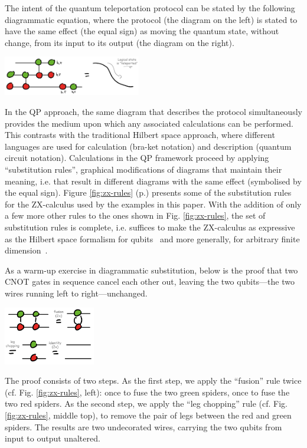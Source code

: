 The intent of the quantum teleportation protocol can be stated by the following diagrammatic equation, where the protocol (the diagram on the left) is stated to have the same effect (the equal sign) as moving the quantum state, without change, from its input to its output (the diagram on the right).
\begin{center}
    \includegraphics[width=0.45\textwidth]{Sections/pictures/teleportation-diag-reasoning.png}
\end{center}
In the QP approach, the same diagram that describes the protocol simultaneously provides the medium upon which any associated calculations can be performed.
This contrasts with the traditional Hilbert space approach, where different languages are used for calculation (bra-ket notation) and description (quantum circuit notation).
Calculations in the QP framework proceed by applying ``substitution rules'', graphical modifications of diagrams that maintain their meaning, i.e. that result in different diagrams with the same effect (symbolised by the equal sign).
Figure \ref{fig:zx-rules} (p.\pageref{fig:zx-rules}) presents some of the substitution rules for the ZX-calculus used by the examples in this paper. With the addition of only a few more other rules to the ones shown in Fig. \ref{fig:zx-rules}, the set of substitution rules is complete, i.e. suffices to make the ZX-calculus as expressive as the Hilbert space formalism for qubits~\cite{hadzihasanovic2018two} and more generally, for arbitrary finite dimension~\cite{poor2023completeness}.

As a warm-up exercise in diagrammatic substitution, below is the proof that two CNOT gates in sequence cancel each other out, leaving the two qubits---the two wires running left to right---unchanged.
\begin{center}
    \includegraphics[width=0.3\textwidth]{Sections/pictures/double-cx-two-lines.png}
\end{center}
The proof consists of two steps.
As the first step, we apply the ``fusion'' rule twice (cf. Fig. \ref{fig:zx-rules}, left): once to fuse the two green spiders, once to fuse the two red spiders.
As the second step, we apply the ``leg chopping'' rule (cf. Fig. \ref{fig:zx-rules}, middle top), to remove the pair of legs between the red and green spiders.
The results are two undecorated wires, carrying the two qubits from input to output unaltered.

